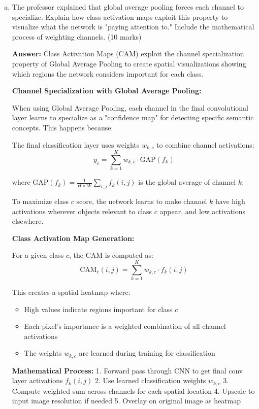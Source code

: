 \documentclass[12pt]{article}
\newcommand{\answer}[1]{{\color{answercolor}\textbf{Answer:} #1}}
\newcommand{\explanation}[1]{{\color{explanationcolor}#1}}
\begin{document}
\begin{enumerate}[(a)]
    \item The professor explained that global average pooling forces each channel to specialize. Explain how class activation maps exploit this property to visualize what the network is "paying attention to." Include the mathematical process of weighting channels. \hfill (10 marks)
    
    \answer{Class Activation Maps (CAM) exploit the channel specialization property of Global Average Pooling to create spatial visualizations showing which regions the network considers important for each class.}
    
    \explanation{
    \textbf{Channel Specialization with Global Average Pooling:}
    
    When using Global Average Pooling, each channel in the final convolutional layer learns to specialize as a "confidence map" for detecting specific semantic concepts. This happens because:
    
    The final classification layer uses weights $w_{k,c}$ to combine channel activations:
    $$y_c = \sum_{k=1}^K w_{k,c} \cdot \text{GAP}(f_k)$$
    
    where $\text{GAP}(f_k) = \frac{1}{H \times W} \sum_{i,j} f_k(i,j)$ is the global average of channel $k$.
    
    To maximize class $c$ score, the network learns to make channel $k$ have high activations wherever objects relevant to class $c$ appear, and low activations elsewhere.
    
    \textbf{Class Activation Map Generation:}
    
    For a given class $c$, the CAM is computed as:
    $$\text{CAM}_c(i,j) = \sum_{k=1}^K w_{k,c} \cdot f_k(i,j)$$
    
    This creates a spatial heatmap where:
    \begin{itemize}
        \item High values indicate regions important for class $c$
        \item Each pixel's importance is a weighted combination of all channel activations
        \item The weights $w_{k,c}$ are learned during training for classification
    \end{itemize}
    
    \textbf{Mathematical Process:}
    1. Forward pass through CNN to get final conv layer activations $f_k(i,j)$
    2. Use learned classification weights $w_{k,c}$ 
    3. Compute weighted sum across channels for each spatial location
    4. Upscale to input image resolution if needed
    5. Overlay on original image as heatmap
    
}
\end{enumerate}
\end{document}
